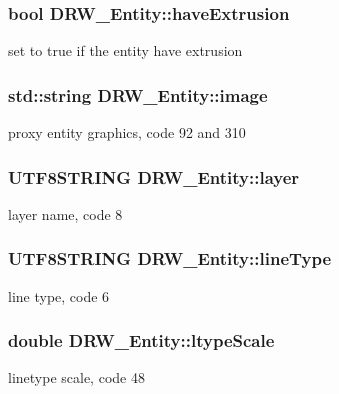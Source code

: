 \subsubsection[{have\+Extrusion}]{\setlength{\rightskip}{0pt plus 5cm}bool D\+R\+W\+\_\+\+Entity\+::have\+Extrusion}\label{class_d_r_w___entity_a62545716d4aec61cabb85576afc78dee}
set to true if the entity have extrusion \hypertarget{class_d_r_w___entity_a10185df2d2f4d551921332c0968652d4}{}
\subsubsection[{image}]{\setlength{\rightskip}{0pt plus 5cm}std\+::string D\+R\+W\+\_\+\+Entity\+::image}\label{class_d_r_w___entity_a10185df2d2f4d551921332c0968652d4}
proxy entity graphics, code 92 and 310 \hypertarget{class_d_r_w___entity_a65b68c6c8712de3e2fada1d263b96042}{}
\subsubsection[{layer}]{\setlength{\rightskip}{0pt plus 5cm}U\+T\+F8\+S\+T\+R\+I\+N\+G D\+R\+W\+\_\+\+Entity\+::layer}\label{class_d_r_w___entity_a65b68c6c8712de3e2fada1d263b96042}
layer name, code 8 \hypertarget{class_d_r_w___entity_a1180883df434a22fdafbc8ac1273e46e}{}
\subsubsection[{line\+Type}]{\setlength{\rightskip}{0pt plus 5cm}U\+T\+F8\+S\+T\+R\+I\+N\+G D\+R\+W\+\_\+\+Entity\+::line\+Type}\label{class_d_r_w___entity_a1180883df434a22fdafbc8ac1273e46e}
line type, code 6 \hypertarget{class_d_r_w___entity_a167d107e81c5b2bb4ee015fa62e2fde2}{}
\subsubsection[{ltype\+Scale}]{\setlength{\rightskip}{0pt plus 5cm}double D\+R\+W\+\_\+\+Entity\+::ltype\+Scale}\label{class_d_r_w___entity_a167d107e81c5b2bb4ee015fa62e2fde2}
linetype scale, code 48 \hypertarget{class_d_r_w___entity_a5e01429ed3b7199b17367a5c85970a0d}{}
